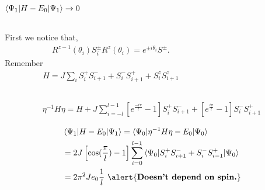 \documentclass{beamer}
\begin{document}
\begin{frame}
    \frametitle{$\braket{\Psi_1|H - E_0|\Psi_1}\rightarrow 0$}
    \begin{columns}
    \begin{column}{0.55\textwidth}
        First we notice that, 
    \begin{align*}
        R^{z-1}(\theta_i) S_i^{\pm} R^{z}(\theta_i) = e^{\pm i \theta_i} S^{\pm}. 
    \end{align*}
    Remember 
    \begin{align*}
        H = J \sum_i S^+_i S^-_{i+1} + S^-_i S^+_{i+1} + S^z_i S^z_{i+1}
    \end{align*}
    \end{column}
    \begin{column}{0.45\textwidth}
    \end{column}
    \end{columns}
    \pause 
    \begin{align*}
        \eta^{-1} H \eta = H + J \sum_{i = -l}^{l-1} \left[e^{\frac{-i\pi}{l}} - 1 \right]  S^+_i S^-_{i+1} + \left[e^{\frac{i\pi}{l}} - 1 \right] S^-_i S^+_{i+1}
    \end{align*}

    \begin{align*}
        &\braket{\Psi_1|H - E_0|\Psi_1} = \braket{\Psi_0|\eta^{-1} H \eta -E_0|\Psi_0} \nonumber \\ 
        &= 2J \left[\cos(\frac{\pi}{l}) - 1 \right] \sum_{i=0}^{l-1} \braket{\Psi_0|S^+_i S^-_{i+1} + S^-_{i} S^+_{i-1}|\Psi_0} \nonumber \\ 
        &=  2 \pi^2 J e_0  \frac{1}{l} \ \alert{\textbf{Doesn't depend on spin.}}
    \end{align*}

\end{frame}
\end{document}
